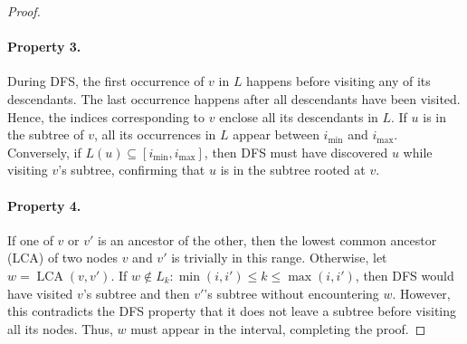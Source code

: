 \begin{proof}
\paragraph{Property 3.} During DFS, the first occurrence of $v$ in $L$ happens before visiting any of its descendants. The last occurrence happens after all descendants have been visited. Hence, the indices corresponding to $v$ enclose all its descendants in $L$. If $u$ is in the subtree of $v$, all its occurrences in $L$ appear between $i_{\min}$ and $i_{\max}$.
Conversely, if $L(u) \subseteq [i_{\min}, i_{\max}]$, then DFS must have discovered $u$ while visiting $v$'s subtree, confirming that $u$ is in the subtree rooted at $v$.

\paragraph{Property 4.} If one of $v$ or $v'$ is an ancestor of the other, then the lowest common ancestor (LCA) of two nodes $v$ and $v'$ is trivially in this range. Otherwise, let $w = \operatorname{LCA}(v, v')$. If $w \notin {L_k : \min(i, i') \leq k \leq \max(i, i')}$, then DFS would have visited $v$'s subtree and then $v'$'s subtree without encountering $w$. However, this contradicts the DFS property that it does not leave a subtree before visiting all its nodes. Thus, $w$ must appear in the interval, completing the proof.


\end{proof}
